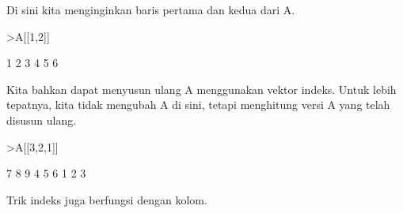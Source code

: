 \documentclass[a4paper,10pt]{article}
\begin{document}
\begin{eulernotebook}
\begin{eulercomment}
\begin{eulercomment}
\begin{eulercomment}
\begin{eulercomment}
\begin{eulercomment}
\begin{eulercomment}
\begin{eulercomment}
Di sini kita menginginkan baris pertama dan kedua dari A.
\end{eulercomment}
\begin{eulerprompt}
>A[[1,2]]
\end{eulerprompt}
\begin{euleroutput}
              1             2             3 
              4             5             6 
\end{euleroutput}
\begin{eulercomment}
Kita bahkan dapat menyusun ulang A menggunakan vektor indeks. Untuk
lebih tepatnya, kita tidak mengubah A di sini, tetapi menghitung versi
A yang telah disusun ulang.
\end{eulercomment}
\begin{eulerprompt}
>A[[3,2,1]]
\end{eulerprompt}
\begin{euleroutput}
              7             8             9 
              4             5             6 
              1             2             3 
\end{euleroutput}
\begin{eulercomment}
Trik indeks juga berfungsi dengan kolom.


\end{eulercomment}
\end{eulercomment}
\end{eulercomment}
\end{eulercomment}
\end{eulercomment}
\end{eulercomment}
\end{eulercomment}
\end{eulernotebook}
\end{document}
